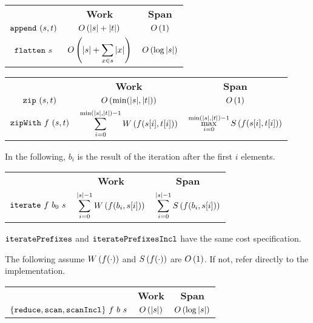 \begin{costspec}[Concatenation]
\begin{tabular}{c|c|c}
& \textbf{Work} & \textbf{Span} \\
%
$\texttt{append}~(s,t)$ &
$\displaystyle O\left({|s| + |t|}\right)$ &
$\displaystyle O\left({1}\right)$ \\
%
$\texttt{flatten}~s$ &
$\displaystyle O\left({|s| + \sum_{x \in s} |x|}\right)$ &
$\displaystyle O\left({\log{|s|}}\right)$
%
\end{tabular}
\end{costspec}

\begin{costspec}[Zip]
\begin{tabular}{c|c|c}
& \textbf{Work} & \textbf{Span} \\
%
$\texttt{zip}~(s,t)$ &
$\displaystyle O\left({\min(|s|,|t|)}\right)$ &
$\displaystyle O\left({1}\right)$ \\
%
$\texttt{zipWith}~f~(s,t)$ &
$\displaystyle \sum_{i = 0}^{\min(|s|,|t|)-1} W\left({f(s[i],t[i])}\right)$ &
$\displaystyle \max_{i = 0}^{\min(|s|,|t|)-1} S\left({f(s[i],t[i])}\right)$
%
\end{tabular}
\end{costspec}

\begin{flex}
\begin{costspec}[Iteration]
In the following, $b_i$ is the result of the iteration after the first $i$
elements.
\begin{tabular}{c|c|c}
& \textbf{Work} & \textbf{Span} \\
%
$\texttt{iterate}~f~b_0~s$ &
$\displaystyle \sum_{i = 0}^{|s|-1} W\left({f(b_i, s[i])}\right)$ &
$\displaystyle \sum_{i = 0}^{|s|-1} S\left({f(b_i, s[i])}\right)$
\end{tabular}
\end{costspec}
\begin{note}
$\texttt{iteratePrefixes}$ and $\texttt{iteratePrefixesIncl}$ have the same cost
specification.
\end{note}
\end{flex}

\begin{costspec}
The following assume $W\left({f(\cdot)}\right)$ and $S\left({f(\cdot)}\right)$ are $O\left({1}\right)$. If not,
refer directly to the implementation.
\begin{tabular}{c|c|c}
& \textbf{Work} & \textbf{Span} \\
%
$\{\texttt{reduce},\texttt{scan},\texttt{scanIncl}\}~f~b~s$ &
$\displaystyle O\left({|s|}\right)$ &
$\displaystyle O\left({\log{|s|}}\right)$
%
\end{tabular}
\end{costspec}

